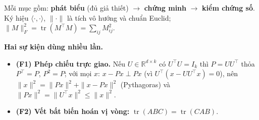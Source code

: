 Mỗi mục gồm: \textbf{phát biểu} (đủ giả thiết) \(\to\) \textbf{chứng minh} \(\to\) \textbf{kiểm chứng số}. Ký hiệu \(\langle\cdot,\cdot\rangle\), \(\|\cdot\|\) là tích vô hướng và chuẩn Euclid; \(\|M\|_F^2=\operatorname{tr}(M^\top M)=\sum_{ij}M_{ij}^2\).

\textbf{Hai sự kiện dùng nhiều lần.}

\begin{itemize}

\item
  \textbf{(F1) Phép chiếu trực giao.} Nếu \(U\in\mathbb R^{d\times k}\) có \(U^\top U=I_k\) thì \(P=UU^\top\) thỏa \(P^\top=P\), \(P^2=P\); với mọi \(x\): \(x-Px\perp Px\) (vì \(U^\top(x-UU^\top x)=0\)), nên \(\|x\|^2=\|Px\|^2+\|x-Px\|^2\) (Pythagoras) và \(\|Px\|^2=\|U^\top x\|^2\le\|x\|^2\).
\item
  \textbf{(F2) Vết bất biến hoán vị vòng:} \(\operatorname{tr}(ABC)=\operatorname{tr}(CAB)\).
\end{itemize}
